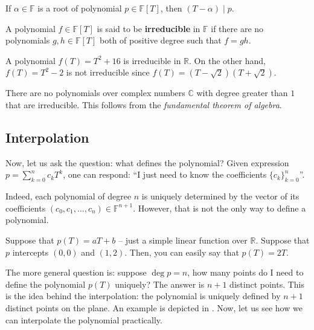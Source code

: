 \documentclass[../../book.tex]{subfiles}
\begin{document}
\begin{proposition}
    If $\alpha \in \mathbb{F}$ is a root of polynomial $p \in \mathbb{F}[T]$, then $(T-\alpha) \mid p$.
\end{proposition}

\begin{definition}
    A polynomial $f \in \mathbb{F}[T]$ is said to be \textbf{irreducible} in $\mathbb{F}$ if there are no polynomials $g,h \in \mathbb{F}[T]$ both of positive degree such that $f = gh$.
\end{definition}

\begin{example}
    A polynomial $f(T) = T^2+16$ is irreducible in $\mathbb{R}$. On the other hand, $f(T) = T^2-2$ is not irreducible since $f(T) = (T-\sqrt{2})(T+\sqrt{2})$. 
\end{example}

\begin{example}
    There are no polynomials over complex numbers $\mathbb{C}$ with degree greater than $1$ that are irreducible. This follows from the \textit{fundamental theorem of algebra}.
\end{example}

\subsection{Interpolation}

Now, let us ask the question: what defines the polynomial? 
Given expression $p = \sum_{k=0}^n c_kT^k$, one can respond: ``I just need to know the coefficients $\{c_k\}_{k=0}^n$''.

Indeed, each polynomial of degree $n$ is uniquely determined by the vector of its coefficients $(c_0,c_1,\dots,c_n) \in \mathbb{F}^{n+1}$. However, that is not the only way to define a polynomial.

Suppose that $p(T) = aT + b$ -- just a simple linear function over $\mathbb{R}$. Suppose that $p$ intercepts $(0,0)$ and $(1,2)$. Then, you can easily say that $p(T) = 2T$. 

The more general question is: suppose $\deg p = n$, how many points do I need to define the polynomial $p(T)$ uniquely? 
The answer is $n+1$ distinct points. 
This is the idea behind the interpolation:
the polynomial is uniquely defined by $n+1$ distinct points on the plane. An example is depicted 
in . Now, let us see how we can interpolate the polynomial practically.
\end{document}
